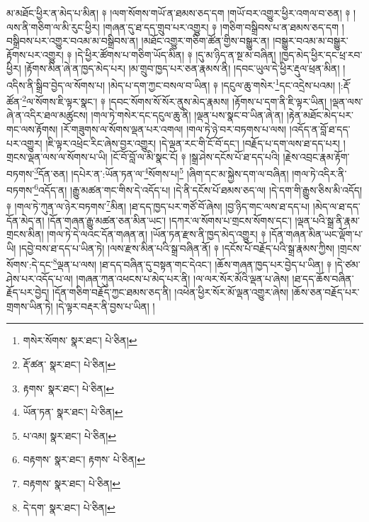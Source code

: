 མ་མཐོང་ཕྱིར་ན་མེད་པ་མིན། ༈ །ལག་སོགས་གཡོ་ན་ཐམས་ཅད་དག །གཡོ་བར་འགྱུར་ཕྱིར་འགལ་བ་ཅན། ༈ །ལས་ནི་གཅིག་ལ་མི་རུང་ཕྱིར། །གཞན་དུ་ཐ་དད་གྲུབ་པར་འགྱུར། ༈ །གཅིག་བསྒྲིབས་པ་ན་ཐམས་ཅད་དག །བསྒྲིབས་པར་འགྱུར་བའམ་མ་བསྒྲིབས་ན། །མཐོང་འགྱུར་གཅིག་ཚོན་གྱིས་བསྒྱུར་ན། །བསྒྱུར་བའམ་མ་བསྒྱུར་རྟོགས་པར་འགྱུར། ༈ །དེ་ཕྱིར་ཚོགས་པ་གཅིག་ཡོད་མིན། ༈ །དུ་མ་ཉིད་ན་སྔ་མ་བཞིན། །ཁྱད་མེད་ཕྱིར་དང་ཕྲ་རབ་ཕྱིར། །རྟོགས་མིན་ཞེ་ན་ཁྱད་མེད་པར། །མ་གྲུབ་ཁྱད་པར་ཅན་རྣམས་ནི། །དབང་ཡུལ་དེ་ཕྱིར་རྡུལ་ཕྲན་མིན། །འདིས་ནི་སྒྲིབ་བྱེད་ལ་སོགས་པ། །མེད་པ་དག་ཀྱང་བསལ་བ་ཡིན། ༈ །དངུལ་ཆུ་གསེར་\footnote{གསེར་སོགས་  སྣར་ཐང་།  པེ་ཅིན། }དང་འདྲེས་པའམ། །:རྡོ་ཚོན་\footnote{རྡོ་ཚན་  སྣར་ཐང་།  པེ་ཅིན། }ལ་སོགས་ཇི་ལྟར་སྣང་། ༈ །དབང་སོགས་སོ་སོར་ནུས་མེད་རྣམས། །རྟོགས་པ་དག་ནི་ཇི་ལྟར་ཡིན། །ལྡན་ལས་ཞེ་ན་འདིར་ཐལ་མཚུངས། །གལ་ཏེ་གསེར་དང་དངུལ་ཆུ་ནི། །ལྡན་པས་སྣང་བ་ཡིན་ཞེ་ན། །རྟེན་མཐོང་མེད་པར་གང་ལས་རྟོགས། །རོ་གཟུགས་ལ་སོགས་ལྡན་པར་འགལ། །གལ་ཏེ་ཉེ་བར་བཏགས་པ་ལས། །འདོད་ན་བློ་ཐ་དད་པར་འགྱུར། །ཇི་ལྟར་འཕྲེང་རིང་ཞེས་བྱར་འགྱུར། །དེ་ལྡན་རང་གི་ངོ་བོ་དང་། །བརྗོད་པ་དག་ལས་ཐ་དད་པར། །གྲངས་ལྡན་ལས་ལ་སོགས་པ་ཡི། །ངོ་བོ་བློ་ལ་མི་སྣང་ངོ། ༈ །སྒྲ་ཤེས་དངོས་པོ་ཐ་དད་པའི། །རྗེས་འབྲང་རྣམ་རྟོག་བཏགས་\footnote{རྟགས་  སྣར་ཐང་།  པེ་ཅིན། }དོན་ཅན། །དཔེར་ན་:ཡོན་ཏན་ལ་\footnote{ཡོན་ཏན་  སྣར་ཐང་།  པེ་ཅིན། }སོགས་པ།\footnote{པ་འམ།  སྣར་ཐང་།  པེ་ཅིན། } །ཞིག་དང་མ་སྐྱེས་དག་ལ་བཞིན། །གལ་ཏེ་འདིར་ནི་བཏགས་\footnote{བརྟགས་  སྣར་ཐང་། རྟགས་  པེ་ཅིན། }འདོད་ན། །རྒྱུ་མཚན་གང་གིས་དེ་འདོད་པ། །དེ་ནི་དངོས་པོ་ཐམས་ཅད་ལ། །དེ་དག་གི་རྒྱུས་ཅིས་མི་འདོད། ༈ །གལ་ཏེ་ཀུན་ལ་ཉེར་བཏགས་\footnote{བརྟགས་  སྣར་ཐང་།  པེ་ཅིན། }མིན། །ཐ་དད་ཁྱད་པར་གཙོ་བོ་ཞེས། །བྱ་ཉིད་གང་ལས་ཐ་དད་པ། །མེད་ལ་ཐ་དད་དོན་མེད་ན། །དོན་གཞན་རྒྱུ་མཚན་ཅན་མིན་ཡང་། །དཀར་ལ་སོགས་པ་གྲངས་སོགས་དང་། །ལྡན་པའི་སྒྲ་ནི་རྣམ་གྲངས་མིན། །གལ་ཏེ་དེ་ལའང་དོན་གཞན་ན། །ཡོན་ཏན་རྫས་ནི་ཁྱད་མེད་འགྱུར། ༈ །དོན་གཞན་མིན་ཡང་ལྡོག་པ་ཡི། །དབྱེ་བས་ཐ་དད་པ་ཡིན་ཏེ། །ལས་རྫས་མིན་པའི་སྒྲ་བཞིན་ནོ། ༈ །དངོས་པོ་བརྗོད་པའི་སྒྲ་རྣམས་ཀྱིས། །གྲངས་སོགས་:དེ་དང་\footnote{དེ་དག་  སྣར་ཐང་།  པེ་ཅིན། }ལྡན་པ་ལས། །ཐ་དད་བཞིན་དུ་བསྟན་གང་དེའང་། །ཆོས་གཞན་ཁྱད་པར་བྱེད་པ་ཡིན། ༈ །དེ་ཙམ་ཤེས་པར་འདོད་པ་ལ། །གཞན་ཀུན་འཕངས་པ་མེད་པར་ནི། །ལ་ལར་སོར་མོའི་ལྡན་པ་ཞེས། །ཐ་དད་ཆོས་བཞིན་རྗོད་པར་བྱེད། །དོན་གཅིག་བརྗོད་ཀྱང་ཐམས་ཅད་ནི། །འཕེན་ཕྱིར་སོར་མོ་ལྡན་འགྱུར་ཞེས། །ཆོས་ཅན་བརྗོད་པར་གྲགས་ཡིན་ཏེ། །དེ་ལྟར་བརྡར་ནི་བྱས་པ་ཡིན། །
